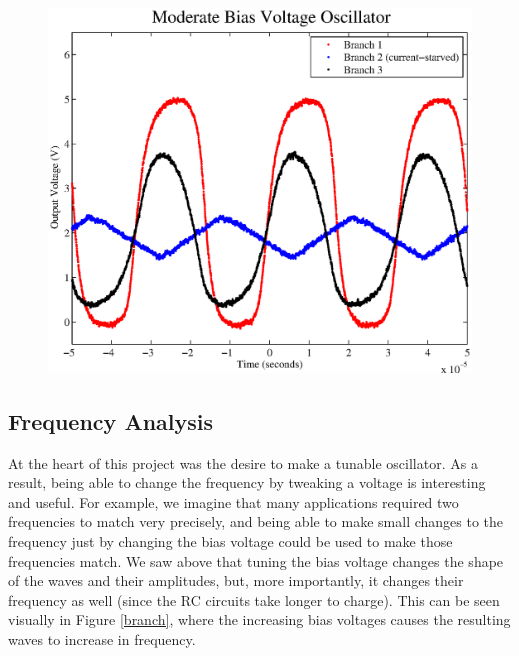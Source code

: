 \documentclass{article}
\begin{document}
\begin{figure}[H]
\centering
\includegraphics[scale=.6]{moderate_bias.eps}
\caption{}
\label{moderateBias}
\end{figure}

\subsection*{Frequency Analysis}

At the heart of this project was the desire to make a tunable oscillator. As a result, being able to change the frequency by tweaking a voltage is interesting and useful.  For example, we imagine that many applications required two frequencies to match very precisely, and being able to make small changes to the frequency just by changing the bias voltage could be used to make those frequencies match.  We saw above that tuning the bias voltage changes the shape of the waves and their amplitudes, but, more importantly, it changes their frequency as well (since the RC circuits take longer to charge).  This can be seen visually in Figure \ref{branch}, where the increasing bias voltages causes the resulting waves to increase in frequency.
\end{document}
